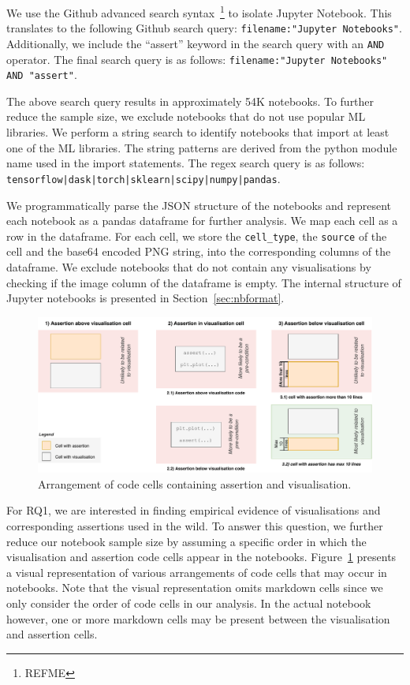 \documentclass[acmsmall,screen,review,anonymous]{acmart}
\begin{document}
We use the Github advanced search syntax~\footnote{REFME} to isolate Jupyter Notebook. This translates to the following Github search query: \texttt{filename:"Jupyter Notebooks"}. Additionally, we include the ``assert'' keyword in the search query with an \texttt{AND} operator. The final search query is as follows: \texttt{filename:"Jupyter Notebooks" AND "assert"}.

The above search query results in approximately 54K notebooks. To further reduce the sample size, we exclude notebooks that do not use popular ML libraries. We perform a string search to identify notebooks that import at least one of the ML libraries. The string patterns are derived from the python module name used in the import statements. The regex search query is as follows: \texttt{tensorflow|dask|torch|sklearn|scipy|numpy|pandas}.

We programmatically parse the JSON structure of the notebooks and represent each notebook as a pandas dataframe for further analysis. We map each cell as a row in the dataframe. For each cell, we store the \texttt{cell\_type}, the \texttt{source} of the cell and the base64 encoded PNG string, into the corresponding columns of the dataframe. We exclude notebooks that do not contain any visualisations by checking if the image column of the dataframe is empty. The internal structure of Jupyter notebooks is presented in Section~\ref{sec:nbformat}.

\begin{figure}
  \centering
  \includegraphics[width=\textwidth]{nb-structure.pdf}
  \caption{Arrangement of code cells containing assertion and
    visualisation.}
  \label{fig:cell-arrangement}
\end{figure}

For RQ1, we are interested in finding empirical evidence of visualisations and corresponding assertions used in the wild. To answer this question, we further reduce our notebook sample size by assuming a specific order in which the visualisation and assertion code cells appear in the notebooks. Figure~\ref{fig:cell-arrangement} presents a visual representation of various arrangements of code cells that may occur in notebooks. Note that the visual representation omits markdown cells since we only consider the order of code cells in our analysis. In the actual notebook however, one or more markdown cells may be present between the visualisation and assertion cells.
\end{document}
